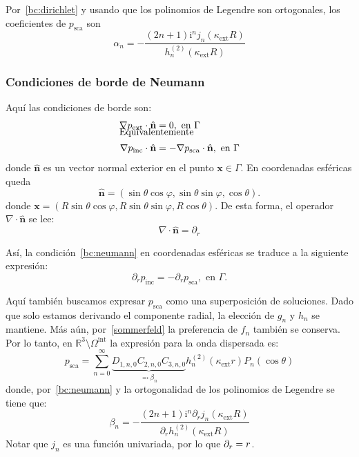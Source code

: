 \documentclass[11pt]{article}
\numberwithin{equation}{section}
\let\d\relax
\newcommand{\d}[1]{\,\frac{\mathrm{d}}{\mathrm{d}#1}}
\def\R{\mathbb{R}}
\def\x{\textbf{x}}
\def\n{\hat{\textbf{n}}}
\let\i\relax
\def\i{\mathrm{i}}
\def\exterior{\textrm{ext}}
\def\interior{\textrm{int}}
\def\inc{\textrm{inc}}
\def\sca{\textrm{sca}}
\begin{document}
\noindent Por~\eqref{bc:dirichlet} y usando que los polinomios de Legendre son
ortogonales, los coeficientes de \(p_{\sca}\) son
\begin{equation}\label{ext:psca:coef:dirichlet}
	\alpha_n 
	= 
	-\frac
	{
		(2n+1)\i^n j_n(\kappa_{\exterior} R)
	}
	{
		h_n^{(2)}(\kappa_{\exterior} R)
	}
\end{equation}

\subsubsection{Condiciones de borde de Neumann}\label{sssec:a:exterior:neumann}

\noindent Aquí las condiciones de borde son:
\begin{align}
\label{bc:neumann}
	\nabla p_{\exterior}\cdot \n &= 0, \text{ en }
	\Gamma\\[-1em]
	\intertext{Equivalentemente}
	\nabla p_{\inc}\cdot \n &= -\nabla p_{\sca}\cdot \n, \text{ en }
	\Gamma
\end{align}
donde \(\n\) es un vector normal exterior en el punto \(\x\in\Gamma\). En coordenadas
esféricas queda
\begin{equation}\label{n}
	\n = (\sin\theta\cos\varphi, \sin\theta\sin\varphi, \cos\theta).
\end{equation}
donde \(\x = (R\sin\theta\cos\varphi, R\sin\theta\sin\varphi, R\cos\theta)\).
De esta forma, el operador \(\nabla\cdot\n\) se lee:
\begin{equation}
\label{nabla.n}
	\nabla\cdot\n = \partial_{r}
\end{equation}

\noindent Así, la condición~\eqref{bc:neumann} en coordenadas esféricas
se traduce a la siguiente expresión:
\begin{equation}\label{neumann:esfericas}
	\partial_{r} p_{\inc} = - \partial_{r} p_{\sca}, \text{ en } \Gamma.
\end{equation}

\noindent Aquí también buscamos expresar \(p_{\sca}\) como una superposición de
soluciones. Dado que
solo estamos derivando el componente radial, la elección de \(g_n\) y \(h_n\) se
mantiene. Más aún, por~\eqref{sommerfeld} la preferencia de \(f_n\) también se
conserva. Por lo tanto, en \(\R^3\setminus\Omega^{\interior}\) la expresión para
la onda dispersada es:
\begin{equation}
\label{ext:psca:neumann:forma}
	p_{\sca}
	=
	\sum_{n=0}^{\infty}
	\underbrace{D_{1,n,0} C_{2,n,0} C_{3,n,0}}_{\eqqcolon \beta_n}
		h_{n}^{(2)}(\kappa_{\exterior} r)
		P_{n}(\cos\theta)
\end{equation}
donde, por~\eqref{bc:neumann} y la ortogonalidad de los polinomios de Legendre
se tiene que:
\begin{equation}
\label{ext:psca:neumann:coef}
	\beta_n
	=
	-\frac
	{
		(2n+1) \i^n \partial_{r} j_n(\kappa_{\exterior} R)
	}
	{
		\partial_r h_n^{(2)}(\kappa_{\exterior} R)
	}
\end{equation}
Notar que \(j_n\) es una función univariada, por lo que \(\partial_r = \d{r}\).
\end{document}
